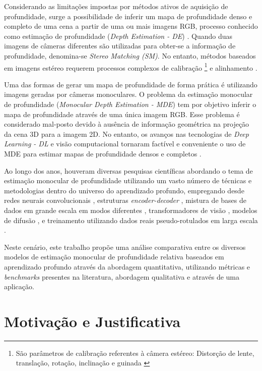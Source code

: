 Considerando as limitações impostas por métodos ativos de aquisição de profundidade, surge a possibilidade de inferir um mapa de profundidade denso e completo de uma cena a partir de uma ou mais imagens RGB, processo conhecido como estimação de profundidade (\textit{Depth Estimation - DE}) \cite{rajapaksha2024deep}. Quando duas imagens de câmeras diferentes são utilizadas para obter-se a informação de profundidade, denomina-se \textit{Stereo Matching (SM)}. No entanto, métodos baseados em imagens estéreo requerem processos complexos de calibração \footnote{São parâmetros de calibração referentes à câmera estéreo: Distorção de lente, translação, rotação, inclinação e guinada \cite{ding2011stereo} } e alinhamento \cite{dong2022towards}.


Uma das formas de gerar um mapa de profundidade de forma prática é utilizando imagens geradas por câmeras monoculares. O problema da estimação monocular de profundidade (\textit{Monocular Depth Estimation - MDE}) tem por objetivo inferir o mapa de profundidade através de uma única imagem RGB. Esse problema é considerado mal-posto devido à ausência de informação geométrica na projeção da cena 3D para a imagem 2D. No entanto, os avanços nas tecnologias de \textit{Deep Learning - DL} e visão computacional tornaram factível e conveniente o uso de MDE para estimar mapas de profundidade densos e completos \cite{spencer2024third} \cite{rajapaksha2024deep}. 

Ao longo dos anos, houveram diversas pesquisas científicas abordando o tema de estimação monocular de profundidade utilizando um vasto número de técnicas e metodologias dentro do universo do aprendizado profundo, empregando desde redes neurais convolucionais \cite{kopf2021robust}, estruturas \textit{encoder-decoder} \cite{godard2019digging}, mistura de bases de dados em grande escala em modos diferentes \cite{lasinger2019towards}, transformadores de visão \cite{birkl2023midas}, modelos de difusão \cite{ke2024repurposing}, e treinamento utilizando dados reais pseudo-rotulados em larga escala \cite{yang2024depth}. 

Neste cenário, este trabalho propõe uma análise comparativa entre os diversos modelos de estimação monocular de profundidade relativa baseados em aprendizado profundo através da abordagem quantitativa, utilizando métricas e \textit{benchmarks} presentes na literatura, abordagem qualitativa e através de uma aplicação. 



\section{Motivação e Justificativa} 

